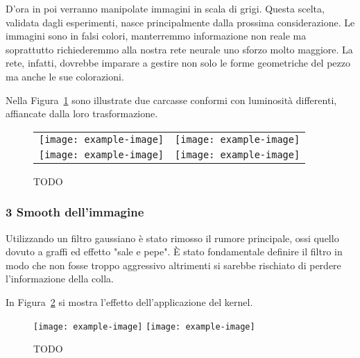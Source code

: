 D'ora in poi verranno manipolate immagini in scala di grigi.
Questa scelta, validata dagli esperimenti, nasce principalmente dalla prossima considerazione.
Le immagini sono in falsi colori, manterremmo informazione non reale ma soprattutto richiederemmo alla nostra rete neurale uno sforzo molto maggiore.
La rete, infatti, dovrebbe imparare a gestire non solo le forme geometriche del pezzo ma anche le sue colorazioni.

Nella Figura~\ref{fig:equalizzazione} sono illustrate due carcasse conformi con luminosità differenti, affiancate dalla loro trasformazione.
\begin{figure}[ht] %
  \begin{center}
    \begin{tabular}{cc}
      \texttt{[image: example-image]} &
      \texttt{[image: example-image]} \\
      \texttt{[image: example-image]} &
      \texttt{[image: example-image]}
    \end{tabular}
    \caption{TODO}
    \label{fig:equalizzazione}
  \end{center}
\end{figure}


\subsubsection{3 Smooth dell'immagine}
Utilizzando un filtro gaussiano è stato rimosso il rumore principale, ossi quello dovuto a graffi ed effetto "sale e pepe".
È stato fondamentale definire il filtro in modo che non fosse troppo aggressivo altrimenti si sarebbe rischiato di perdere l'informazione della colla.

In Figura~\ref{fig:smooth} si mostra l'effetto dell'applicazione del kernel.
\begin{figure}[ht] %
  \begin{center}
    \texttt{[image: example-image]}
    \texttt{[image: example-image]}
    \caption{TODO}
    \label{fig:smooth}
  \end{center}
\end{figure}

